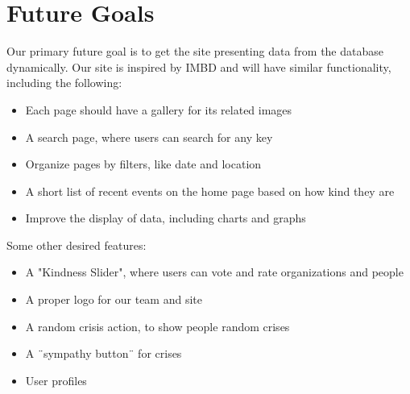 \documentclass[12pt]{report}
\begin{document}
\newpage
\section*{Future Goals}
\hfill


Our primary future goal is to get the site presenting data from the database dynamically.
Our site is inspired by IMBD and will have similar functionality, including the following:
\begin{itemize}
\item Each page should have a gallery for its related images
\item A search page, where users can search for any key
\item Organize pages by filters, like date and location
\item A short list of recent events on the home page based on how kind they are
\item Improve the display of data, including charts and graphs
\end{itemize}

\hfill \newline
Some other desired features:
\begin{itemize}
\item A  "Kindness Slider", where users can vote and rate organizations and people
\item A proper logo for our team and site
\item A random crisis action, to show people random crises
\item A ¨sympathy button¨ for crises
\item User profiles
\end{itemize}
\end{document}
